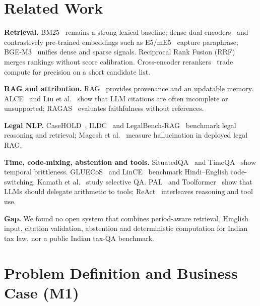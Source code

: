 \documentclass[conference]{IEEEtran}
\begin{document}
\section{Related Work}

\textbf{Retrieval.} BM25~\cite{robertson2009bm25} remains a strong lexical baseline; dense dual
encoders~\cite{karpukhin2020dpr} and contrastively pre-trained embeddings such as
E5/mE5~\cite{wang2022e5,wang2024me5} capture paraphrase; BGE-M3~\cite{chen2024m3} unifies dense and sparse
signals. Reciprocal Rank Fusion (RRF)~\cite{cormack2009rrf} merges rankings without score calibration.
Cross-encoder rerankers~\cite{nogueira2019passage} trade compute for precision on a short candidate list.

\textbf{RAG and attribution.} RAG~\cite{lewis2020rag} provides provenance and an updatable memory. ALCE~\cite{gao2023alce}
and Liu et al.~\cite{liu2023verifiability} show that LLM citations are often incomplete or unsupported;
RAGAS~\cite{es2024ragas} evaluates faithfulness without references.

\textbf{Legal NLP.} CaseHOLD~\cite{zheng2021casehold}, ILDC~\cite{malik2021ildc} and
LegalBench-RAG~\cite{pipitone2024legalbenchrag} benchmark legal reasoning and retrieval; Magesh et
al.~\cite{magesh2025hallucination} measure hallucination in deployed legal RAG.

\textbf{Time, code-mixing, abstention and tools.} SituatedQA~\cite{zhang2021situatedqa} and
TimeQA~\cite{chen2021timeqa} show temporal brittleness. GLUECoS~\cite{khanuja2020gluecos} and
LinCE~\cite{aguilar2020lince} benchmark Hindi--English code-switching. Kamath et al.~\cite{kamath2020selective}
study selective QA. PAL~\cite{gao2023pal} and Toolformer~\cite{schick2023toolformer} show that LLMs should
delegate arithmetic to tools; ReAct~\cite{yao2023react} interleaves reasoning and tool use.

\textbf{Gap.} We found no open system that combines period-aware retrieval, Hinglish input, citation
validation, abstention and deterministic computation for Indian tax law, nor a public Indian tax-QA
benchmark.

\section{Problem Definition and Business Case (M1)}
\end{document}
